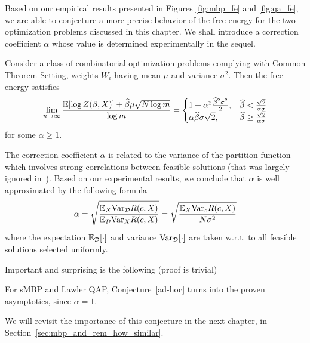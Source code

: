 Based on our empirical results presented in Figures \ref{fig:mbp_fe} and
\ref{fig:qa_fe}, we are able to conjecture a more precise behavior of the free
energy for the two optimization problems discussed in this chapter.
We shall introduce a correction coefficient $\alpha$ whose value 
is determined experimentally in the sequel.

\begin{conj}\label{ad-hoc}
Consider a class of combinatorial optimization problems complying with Common
Theorem Setting, weights $W_i$ having mean $\mu$ and variance $\sigma^2$. Then
the free energy satisfies
\begin{equation}
    \lim_{n\to \infty} \frac{{\mathbb{E}}[\log Z(\beta, X)] +\widehat \beta \mu \sqrt{N\log m}}{\log m}
    =
    \begin{cases}
        1 + \alpha^2\frac{\widehat{\beta}^2\sigma^2}{2},
            &\widehat{\beta} < \frac{\sqrt{2}}{\alpha\sigma} \\
\alpha\widehat{\beta}\sigma\sqrt{2}, &\widehat{\beta} \geq \frac{\sqrt{2}}
{\alpha\sigma}
    \end{cases}
\end{equation}
for some $\alpha \ge 1$.
%
\end{conj}

The correction coefficient $\alpha$ is related to the variance of the partition
function which involves strong correlations between feasible solutions (that was
largely ignored in~\citep{aofa2014}). Based on our experimental results, we
conclude that $\alpha$ is well approximated by the following formula
\begin{equation}\label{spa45}
    \alpha = \sqrt{\frac{{\mathbb{E}}_X{\mathrm{Var}}_{\mathcal{D}} R(c,X)}{{\mathbb{E}}_{\mathcal{D}}{\mathrm{Var}}_X R(c,X)}} = \sqrt{\frac{{\mathbb{E}}_X{\mathrm{Var}}_c R(c,X)}{N\sigma^2}}
\end{equation}
where the expectation ${\mathbb{E}}_{\mathcal{D}}[\cdot]$ and variance
${\mathrm{Var}}_{\mathcal{D}}[\cdot]$ are taken w.r.t. to all feasible solutions selected
uniformly.

Important and surprising is the following (proof is trivial)
\begin{statement} 
  For sMBP and Lawler QAP, Conjecture~\ref{ad-hoc} turns into the proven asymptotics,
  since $\alpha = 1$.
\end{statement}

We will revisit the importance of this conjecture in the next chapter, in
Section~\ref{sec:mbp_and_rem_how_similar}.

